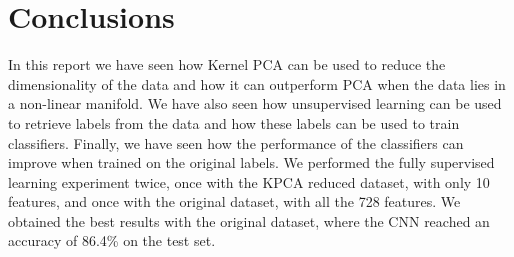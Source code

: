 \section{Conclusions}
In this report we have seen how Kernel PCA can be used to reduce the
dimensionality of the data and how it can outperform PCA when the data
lies in a non-linear manifold.
We have also seen how unsupervised learning can be used to retrieve
labels from the data and how these labels can be used to train classifiers.
Finally, we have seen how the performance of the classifiers can improve
when trained on the original labels.
We performed the fully supervised learning experiment twice, once with
the KPCA reduced dataset, with only 10 features, and once with the original dataset, with all the 728 features. We obtained
the best results with the original dataset, where the CNN reached an
accuracy of 86.4\% on the test set.
